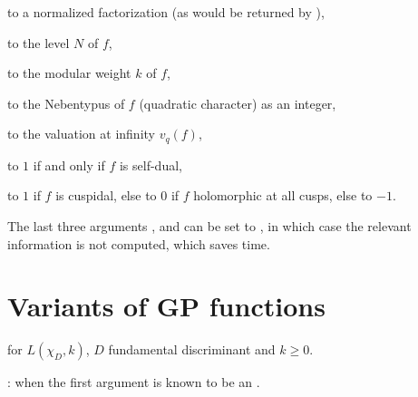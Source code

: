 \item {} to a normalized factorization (as would be returned by
),

\item {} to the level $N$ of $f$,

\item {} to the modular weight $k$ of $f$,

\item {} to the Nebentypus of $f$ (quadratic character)
as an integer,

\item {} to the valuation at infinity $v_q(f)$,

\item {} to $1$ if and only if $f$ is self-dual,

\item {} to $1$ if $f$ is cuspidal, else to $0$ if $f$ holomorphic
at all cusps, else to $-1$.

The last three arguments ,  and  can be set to
, in which case the relevant information is not computed, which
saves time.

\section{Variants of GP functions}





 for $L(\chi_D, k)$, $D$ fundamental
discriminant and $k \geq 0$.

:
  when the first argument is known to be an .





